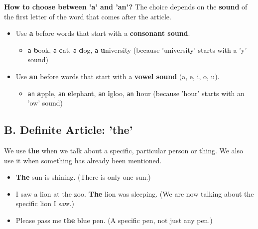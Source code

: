 \textbf{How to choose between 'a' and 'an'?}
The choice depends on the \textbf{sound} of the first letter of the word that comes after the article.
\begin{itemize}
    \item Use \textbf{a} before words that start with a \textbf{consonant sound}.
    \begin{itemize}
        \item \texttt{a} \textbf{b}ook, \texttt{a} \textbf{c}at, \texttt{a} \textbf{d}og, \texttt{a} \textbf{u}niversity (because 'university' starts with a 'y' sound)
    \end{itemize}
    \item Use \textbf{an} before words that start with a \textbf{vowel sound} (a, e, i, o, u).
    \begin{itemize}
        \item \texttt{an} \textbf{a}pple, \texttt{an} \textbf{e}lephant, \texttt{an} \textbf{i}gloo, \texttt{an} \textbf{h}our (because 'hour' starts with an 'ow' sound)
    \end{itemize}
\end{itemize}

\subsection*{B. Definite Article: 'the'}
We use \textbf{the} when we talk about a specific, particular person or thing. We also use it when something has already been mentioned.
\begin{itemize}
    \item \textbf{The} sun is shining. (There is only one sun.)
    \item I saw a lion at the zoo. \textbf{The} lion was sleeping. (We are now talking about the specific lion I saw.)
    \item Please pass me \textbf{the} blue pen. (A specific pen, not just any pen.)
\end{itemize}

